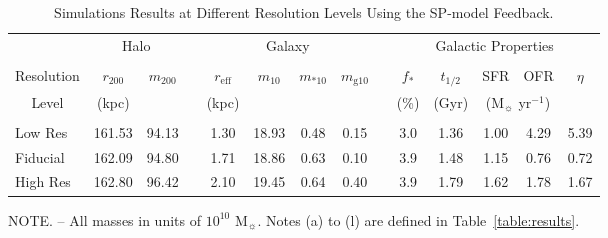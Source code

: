 \begin{table*}
\centering
\caption{Simulations Results at Different Resolution Levels Using the SP-model Feedback.}
\label{table:results_res}
\begin{threeparttable}
\begin{tabular}{@{\ \ }l@{\ \ \ }c@{ \ }c@{\ \ }c@{\ \ \ \ \ }c@{ \ }c@{ \ }c@{ \ }c@{\ \ }c@{\ \ \ \ \ }c@{ \ }c@{ \ }c@{\ \ \ }c@{\ \ \ }c@{\ \ }}
\hline\hline
 & \multicolumn{2}{c}{Halo} & & \multicolumn{4}{c}{Galaxy} & & \multicolumn{5}{c}{Galactic Properties}\\
 & \multicolumn{2}{c}{\hrulefill} & & \multicolumn{4}{c}{\hrulefill} & & \multicolumn{5}{c}{\hrulefill} \\
Resolution &
$r_{\mathrm{200}}$ \tnote {a} &
$m_{\mathrm{200}}$ \tnote{b} & &
$r_{\mathrm{eff}}$ \tnote{c} &
$m_{\mathrm{10}}$ \tnote{d} &
$m_{\mathrm{*10}}$ \tnote{e} &
$m_{\mathrm{g10}}$ \tnote{f} & &
$f_{\mathrm{*}}$ \tnote{g} &
$t_{1/2}$ \tnote{i} &
SFR \tnote{j} &
OFR \tnote{k} &
$\eta$ \tnote{l} \\

\multicolumn{1}{c}{Level} & (kpc) & & & (kpc) & & & & & (\%) & (Gyr) & \multicolumn{2}{c}{(M$_{\sun}$ yr$^{-1}$)} & \\[0.05 in]
\hline
\\[-1.5mm]
Low Res  & 161.53 & 94.13 & & 1.30 & 18.93 & 0.48 & 0.15 & & 3.0 & 1.36 & 1.00 & 4.29 & 5.39\\
Fiducial & 162.09 & 94.80 & & 1.71 & 18.86 & 0.63 & 0.10 & & 3.9 & 1.48 & 1.15 & 0.76 & 0.72\\
High Res & 162.80 & 96.42 & & 2.10 & 19.45 & 0.64 & 0.40 & & 3.9 & 1.79 & 1.62 & 1.78 & 1.67\\[0.05 in]
\hline\hline
\end{tabular}
\begin{tablenotes}
NOTE. -- All masses in units of $10^{10}$ M$_{\sun}$. Notes (a) to (l) are defined in Table~\ref{table:results}.
\end{tablenotes}
\end{threeparttable}
\end{table*}